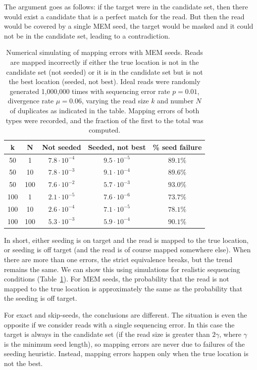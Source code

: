 \documentclass{article}
\begin{document}
The argument goes as follows: if the target were in the candidate set,
then there would exist a candidate that is a perfect match for the read.
But then the read would be covered by a single MEM seed, the target would
be masked and it could not be in the candidate set, leading to a
contradiction.

\begin{table}
\renewcommand{\arraystretch}{1.1}
\centering
\begin{tabular}{ccccc}
k & N & Not seeded & Seeded, not best & \% seed failure \\
\hline
50  &  1  & $7.8 \cdot 10^{-4}$ & $9.5 \cdot 10^{-5}$ & $89.1\%$ \\
50  & 10  & $7.8 \cdot 10^{-3}$ & $9.1 \cdot 10^{-4}$ & $89.6\%$ \\
50  & 100 & $7.6 \cdot 10^{-2}$ & $5.7 \cdot 10^{-3}$ & $93.0\%$ \\
100 &  1  & $2.1 \cdot 10^{-5}$ & $7.6 \cdot 10^{-6}$ & $73.7\%$ \\
100 & 10  & $2.6 \cdot 10^{-4}$ & $7.1 \cdot 10^{-5}$ & $78.1\%$ \\
100 & 100 & $5.3 \cdot 10^{-3}$ & $5.9 \cdot 10^{-4}$ & $90.1\%$
\end{tabular}
\caption{Numerical simulating of mapping errors with MEM seeds. Reads are
mapped incorrectly if either the true location is not in the candidate set
(not seeded) or it is in the candidate set but is not the best location
(seeded, not best). Ideal reads were randomly generated 1,000,000 times
with sequencing error rate $p = 0.01$, divergence rate $\mu = 0.06$,
varying the read size $k$ and number $N$ of duplicates as indicated in the
table. Mapping errors of both types were recorded, and the fraction of the
first to the total was computed.}
\label{table_mem}
\end{table}

In short, either seeding is on target and the read is mapped to the true
location, or seeding is off target (and the read is of course mapped
somewhere else). When there are more than one errors, the strict
equivalence breaks, but the trend remains the same. We can show this
using simulations for realistic sequencing conditions
(Table~\ref{table_mem}). For MEM seeds, the probability that the read is
not mapped to the true location is approximately the same as the
probability that the seeding is off target.

For exact and skip-seeds, the conclusions are different. The situation is
even the opposite if we consider reads with a single sequencing error. In
this case the target is always in the candidate set (if the read size is
greater than $2\gamma$, where $\gamma$ is the minimum seed length), so
mapping errors are never due to failures of the seeding heuristic.
Instead, mapping errors happen only when the true location is not the
best.
\end{document}
